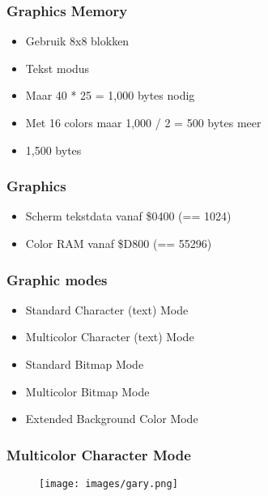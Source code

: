 
\begin{frame}
\frametitle{Graphics Memory}

\begin{itemize}
\item Gebruik 8x8 blokken
\item Tekst modus
\item Maar 40 * 25 = 1,000 bytes nodig
\item Met 16 colors maar 1,000 / 2 = 500 bytes meer
\item 1,500 bytes
\end{itemize}

\end{frame}


\begin{frame}
\frametitle{Graphics}

\begin{itemize}
\item Scherm tekstdata vanaf \$0400 (== 1024)
\item Color RAM vanaf \$D800 (== 55296)
\end{itemize}

\end{frame}


\begin{frame}
\frametitle{Graphic modes}

\begin{itemize}
\item Standard Character (text) Mode
\item Multicolor Character (text) Mode
\item Standard Bitmap Mode
\item Multicolor Bitmap Mode
\item Extended Background Color Mode
\end{itemize}

\end{frame}


\begin{frame}
\frametitle{Multicolor Character Mode}

\begin{figure}
\texttt{[image: images/gary.png]}
\end{figure}

\end{frame}

